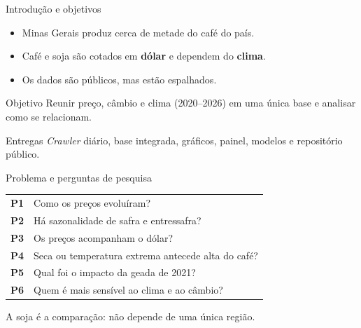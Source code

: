 \documentclass{beamer}
\begin{document}
\begin{frame}{Introdução e objetivos}
    \begin{itemize}
        \item Minas Gerais produz cerca de \alert{metade do café do país}.
        \item Café e soja são cotados em \textbf{dólar} e dependem do \textbf{clima}.
        \item Os dados são públicos, mas estão espalhados.
    \end{itemize}

    \vspace{0.2cm}
    \begin{block}{Objetivo}
        Reunir preço, câmbio e clima (2020--2026) em uma única base e analisar como se relacionam.
    \end{block}

    \begin{exampleblock}{Entregas}
        \textit{Crawler} diário, base integrada, gráficos, painel, modelos e repositório público.
    \end{exampleblock}
\end{frame}

\begin{frame}{Problema e perguntas de pesquisa}
    \begin{center}
        \small
        \renewcommand{\arraystretch}{1.25}
        \begin{tabular}{@{}ll@{}}
            \toprule
            \textbf{P1} & Como os preços evoluíram? \\
            \textbf{P2} & Há sazonalidade de safra e entressafra? \\
            \textbf{P3} & Os preços acompanham o dólar? \\
            \textbf{P4} & Seca ou temperatura extrema antecede alta do café? \\
            \textbf{P5} & Qual foi o impacto da geada de 2021? \\
            \textbf{P6} & Quem é mais sensível ao clima e ao câmbio? \\
            \bottomrule
        \end{tabular}
    \end{center}

    \begin{exampleblock}{}
        A soja é a comparação: não depende de uma única região.
    \end{exampleblock}
\end{frame}
\end{document}

